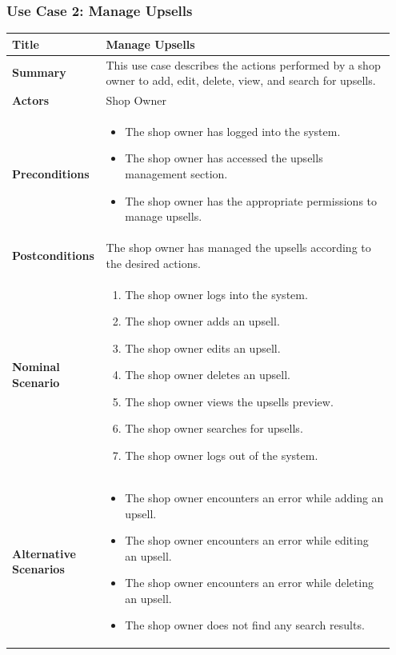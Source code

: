 \subsubsection{Use Case 2: Manage Upsells}
\begin{longtable}{|p{0.2\linewidth}|p{0.75\linewidth}|}
\hline
\textbf{Title} & Manage Upsells \\
\hline
\textbf{Summary} & This use case describes the actions performed by a shop owner to add, edit, delete, view, and search for upsells. \\
\hline
\textbf{Actors} & Shop Owner \\
\hline
\textbf{Preconditions} & 
\begin{itemize}
    \item The shop owner has logged into the system.
    \item The shop owner has accessed the upsells management section.
    \item The shop owner has the appropriate permissions to manage upsells.
\end{itemize} \\
\hline
\textbf{Postconditions} & The shop owner has managed the upsells according to the desired actions. \\
\hline
\textbf{Nominal Scenario} &
\begin{enumerate}
    \item The shop owner logs into the system.
    \item The shop owner adds an upsell.
    \item The shop owner edits an upsell.
    \item The shop owner deletes an upsell.
    \item The shop owner views the upsells preview.
    \item The shop owner searches for upsells.
    \item The shop owner logs out of the system.
\end{enumerate} \\
\hline
\textbf{Alternative Scenarios} &
\begin{itemize}
    \item The shop owner encounters an error while adding an upsell.
    \item The shop owner encounters an error while editing an upsell.
    \item The shop owner encounters an error while deleting an upsell.
    \item The shop owner does not find any search results.
\end{itemize} \\
\hline
\end{longtable}

